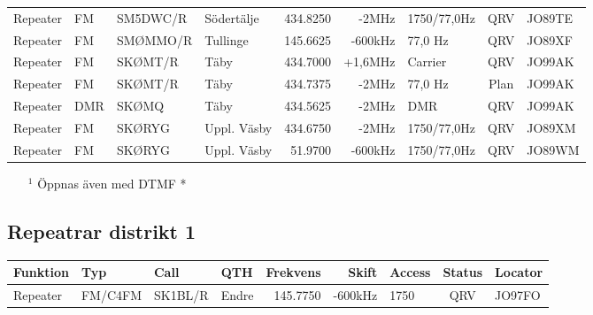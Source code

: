 \begin{landscape}
\begin{longtable}{llllrrlcl}
	Repeater          & FM           & SM5DWC/R      & Södertälje   & 434.8250          & -2MHz          & 1750/77,0Hz     & QRV             & JO89TE           \\
	Repeater          & FM           & SMØMMO/R      & Tullinge     & 145.6625          & -600kHz        & 77,0 Hz         & QRV             & JO89XF           \\
	Repeater          & FM           & SKØMT/R       & Täby         & 434.7000          & +1,6MHz        & Carrier         & QRV             & JO99AK           \\
	Repeater          & FM           & SKØMT/R       & Täby         & 434.7375          & -2MHz          & 77,0 Hz         & Plan            & JO99AK           \\
	Repeater          & DMR          & SKØMQ         & Täby         & 434.5625          & -2MHz          & DMR             & QRV             & JO99AK           \\
	Repeater          & FM           & SKØRYG        & Uppl. Väsby  & 434.6750          & -2MHz          & 1750/77,0Hz     & QRV             & JO89XM           \\
	Repeater          & FM           & SKØRYG        & Uppl. Väsby  & 51.9700           & -600kHz        & 1750/77,0Hz     & QRV             & JO89WM
\end{longtable}
\begin{itemize}
	\item[$^1$] Öppnas även med DTMF *
\end{itemize}
\normalsize

\clearpage

\subsection{Repeatrar distrikt 1}
\footnotesize
\begin{longtable}{llllrrlcl}
\textbf{Funktion} & \textbf{Typ} & \textbf{Call} & \textbf{QTH} & \textbf{Frekvens} & \textbf{Skift} & \textbf{Access} & \textbf{Status} & \textbf{Locator} \\ \hline
\endhead
Repeater&	FM/C4FM&	SK1BL/R	&Endre	&145.7750	&-600kHz	&1750	&QRV	&JO97FO\\
\end{longtable}
\normalsize


\end{landscape}

